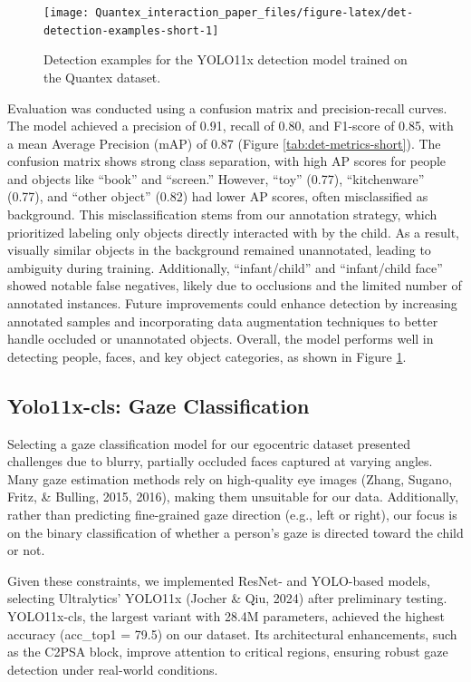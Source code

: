 \documentclass[
  man,floatsintext]{apa6}
\begin{document}
\begin{figure}

{\centering \texttt{[image: Quantex\_interaction\_paper\_files/figure-latex/det-detection-examples-short-1]} 

}

\caption{Detection examples for the YOLO11x detection model trained on the Quantex dataset.}\label{fig:det-detection-examples-short}
\end{figure}

Evaluation was conducted using a confusion matrix and precision-recall curves. The model achieved a precision of 0.91, recall of 0.80, and F1-score of 0.85, with a mean Average Precision (mAP) of 0.87 (Figure \ref{tab:det-metrics-short}). The confusion matrix shows strong class separation, with high AP scores for people and objects like ``book'' and ``screen.'' However, ``toy'' (0.77), ``kitchenware'' (0.77), and ``other object'' (0.82) had lower AP scores, often misclassified as background. This misclassification stems from our annotation strategy, which prioritized labeling only objects directly interacted with by the child. As a result, visually similar objects in the background remained unannotated, leading to ambiguity during training. Additionally, ``infant/child'' and ``infant/child face'' showed notable false negatives, likely due to occlusions and the limited number of annotated instances. Future improvements could enhance detection by increasing annotated samples and incorporating data augmentation techniques to better handle occluded or unannotated objects. Overall, the model performs well in detecting people, faces, and key object categories, as shown in Figure \ref{fig:det-detection-examples-short}.

\subsection{Yolo11x-cls: Gaze Classification}\label{yolo11x-cls}

Selecting a gaze classification model for our egocentric dataset presented challenges due to blurry, partially occluded faces captured at varying angles. Many gaze estimation methods rely on high-quality eye images (Zhang, Sugano, Fritz, \& Bulling, 2015, 2016), making them unsuitable for our data. Additionally, rather than predicting fine-grained gaze direction (e.g., left or right), our focus is on the binary classification of whether a person's gaze is directed toward the child or not.

Given these constraints, we implemented ResNet- and YOLO-based models, selecting Ultralytics' YOLO11x (Jocher \& Qiu, 2024) after preliminary testing. YOLO11x-cls, the largest variant with 28.4M parameters, achieved the highest accuracy (acc\_top1 = 79.5) on our dataset. Its architectural enhancements, such as the C2PSA block, improve attention to critical regions, ensuring robust gaze detection under real-world conditions.
\end{document}
